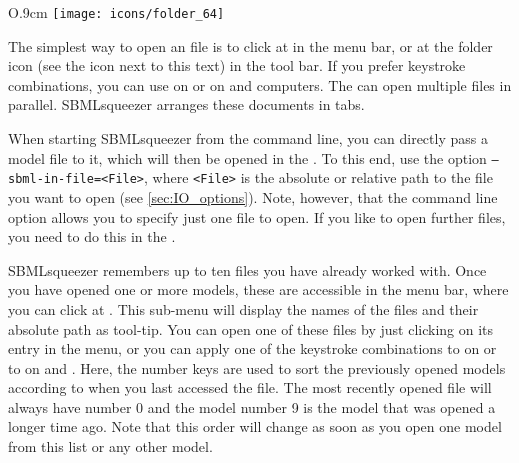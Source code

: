 \begin{wrapfigure}{O}{.9cm}
\vspace{\wrapfigspace}
\texttt{[image: icons/folder\_64]}
\end{wrapfigure}
The simplest way to open an \SBML file is to click at  in the
menu bar, or at the folder icon (see the icon next to this text) in the tool bar.
If you prefer keystroke combinations, you can use  on \MacOSX or
 on \Windows and \Linux computers.
The \GUI can open multiple \SBML files in parallel.
SBMLsqueezer arranges these \SBML documents in tabs.

When starting SBMLsqueezer from the command line, you can directly pass a model
file to it, which will then be opened in the \GUI. To this
end, use the option \texttt{--sbml-in-file=<File>}, where \texttt{<File>} is the
absolute or relative path to the \SBML file you want to open (see
\vref{sec:IO_options}).
Note, however, that the command line option allows you to specify just one file
to open.
If you like to open further files, you need to do this in the \GUI.

SBMLsqueezer remembers up to ten files you have already worked with.
Once you have opened one or more models, these are accessible in the menu bar,
where you can click at .
This sub-menu will display the names of the files and their absolute path as tool-tip.
You can open one of these files by just clicking on its entry in the menu, or
you can apply one of the keystroke combinations  to 
on \MacOSX or  to  on \Linux and \Windows.
Here, the number keys are used to sort the previously opened models according to
when you last accessed the file.
The most recently opened file will always have number 0 and the model number 9
is the model that was opened a longer time ago.
Note that this order will change as soon as you open one model from this list
or any other model.

